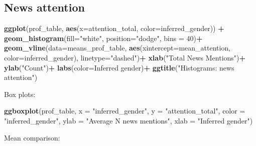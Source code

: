 \documentclass[
]{article}
\newenvironment{Shaded}{\begin{snugshade}}{\end{snugshade}}
\newcommand{\AttributeTok}[1]{\textcolor[rgb]{0.13,0.29,0.53}{#1}}
\newcommand{\DecValTok}[1]{\textcolor[rgb]{0.00,0.00,0.81}{#1}}
\newcommand{\FunctionTok}[1]{\textcolor[rgb]{0.13,0.29,0.53}{\textbf{#1}}}
\newcommand{\NormalTok}[1]{#1}
\newcommand{\SpecialCharTok}[1]{\textcolor[rgb]{0.81,0.36,0.00}{\textbf{#1}}}
\newcommand{\StringTok}[1]{\textcolor[rgb]{0.31,0.60,0.02}{#1}}
\begin{document}
\hypertarget{news-attention}{%
\subsection{News attention}\label{news-attention}}

\begin{Shaded}
\begin{Highlighting}[]
\FunctionTok{ggplot}\NormalTok{(prof\_table, }\FunctionTok{aes}\NormalTok{(}\AttributeTok{x=}\NormalTok{attention\_total, }\AttributeTok{color=}\NormalTok{inferred\_gender)) }\SpecialCharTok{+}
  \FunctionTok{geom\_histogram}\NormalTok{(}\AttributeTok{fill=}\StringTok{"white"}\NormalTok{, }\AttributeTok{position=}\StringTok{"dodge"}\NormalTok{, }\AttributeTok{bins =} \DecValTok{40}\NormalTok{)}\SpecialCharTok{+}
  \FunctionTok{geom\_vline}\NormalTok{(}\AttributeTok{data=}\NormalTok{means\_prof\_table, }\FunctionTok{aes}\NormalTok{(}\AttributeTok{xintercept=}\NormalTok{mean\_attention, }\AttributeTok{color=}\NormalTok{inferred\_gender),}
             \AttributeTok{linetype=}\StringTok{"dashed"}\NormalTok{)}\SpecialCharTok{+}
  \FunctionTok{xlab}\NormalTok{(}\StringTok{"Total News Mentions"}\NormalTok{)}\SpecialCharTok{+}
  \FunctionTok{ylab}\NormalTok{(}\StringTok{"Count"}\NormalTok{)}\SpecialCharTok{+}
  \FunctionTok{labs}\NormalTok{(}\AttributeTok{color=}\StringTok{\textquotesingle{}Inferred gender\textquotesingle{}}\NormalTok{)}\SpecialCharTok{+}
  \FunctionTok{ggtitle}\NormalTok{(}\StringTok{"Histograms: news attention"}\NormalTok{)}
\end{Highlighting}
\end{Shaded}

Box plots:

\begin{Shaded}
\begin{Highlighting}[]
\FunctionTok{ggboxplot}\NormalTok{(prof\_table, }\AttributeTok{x =} \StringTok{"inferred\_gender"}\NormalTok{, }\AttributeTok{y =} \StringTok{"attention\_total"}\NormalTok{, }
          \AttributeTok{color =} \StringTok{"inferred\_gender"}\NormalTok{,}
          \AttributeTok{ylab =} \StringTok{"Average N news mentions"}\NormalTok{, }\AttributeTok{xlab =} \StringTok{"Inferred gender"}\NormalTok{)}
\end{Highlighting}
\end{Shaded}

Mean comparison:

\begin{Shaded}
\end{Shaded}
\end{document}

